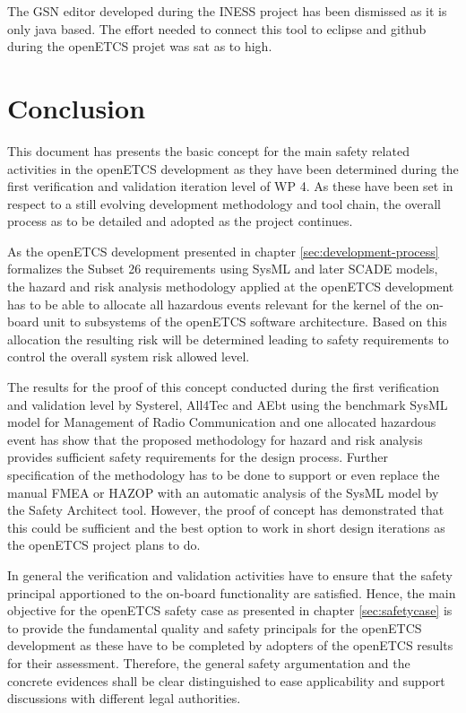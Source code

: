 \documentclass{template/openetcs_report}
\begin{document}
The GSN editor developed during the INESS project has been dismissed as it is only java based. The effort needed to connect this tool to eclipse and github during the openETCS projet was sat as to high. 
 
\chapter{Conclusion}
\label{(sec:conclusion)}

This document has presents the basic concept for the main safety related activities in the openETCS development as they have been determined during the first verification and validation iteration level of WP 4. As these have been set in respect to a still evolving development methodology and tool chain, the overall process as to be detailed and adopted as the project continues. 

As the openETCS development presented in chapter \ref{sec:development-process} formalizes the Subset 26 requirements using SysML and later SCADE models, the hazard and risk analysis methodology applied at the openETCS development has to be able to allocate all hazardous events relevant for the kernel of the on-board unit to subsystems of the openETCS software architecture. Based on this allocation the resulting risk will be determined leading to safety requirements to control the overall system risk allowed level. 

The results for the proof of this concept conducted during the first verification and validation level by Systerel, All4Tec and AEbt using the benchmark SysML model for Management of Radio Communication and one allocated hazardous event has show that the proposed methodology for hazard and risk analysis provides sufficient safety requirements for the design process. Further specification of the methodology has to be done to support or even replace the manual FMEA or HAZOP with an automatic analysis of the SysML model by the Safety Architect tool. However, the proof of concept has demonstrated that this could be sufficient and the best option to work in short design iterations as the openETCS project plans to do. 

In general the verification and validation activities have to ensure that the safety principal apportioned to the on-board functionality are satisfied. Hence, the main objective for the openETCS safety case as presented in chapter \ref{sec:safetycase} is to provide the fundamental quality and safety principals for the openETCS development as these have to be completed by adopters of the openETCS results for their assessment. Therefore, the general safety argumentation and the concrete evidences shall be clear distinguished to ease applicability and support discussions with different legal authorities.
\end{document}
